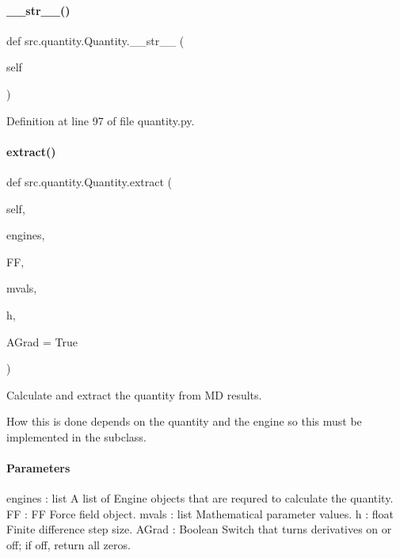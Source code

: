 \paragraph{\texorpdfstring{\+\_\+\+\_\+str\+\_\+\+\_\+()}{\_\_str\_\_()}}
{\footnotesize\ttfamily def src.\+quantity.\+Quantity.\+\_\+\+\_\+str\+\_\+\+\_\+ (\begin{DoxyParamCaption}\item[{}]{self }\end{DoxyParamCaption})}



Definition at line 97 of file quantity.\+py.

\mbox{\label{classsrc_1_1quantity_1_1Quantity_a31f14fa77a8312030e07f3be4b797dec}} 
\paragraph{\texorpdfstring{extract()}{extract()}}
{\footnotesize\ttfamily def src.\+quantity.\+Quantity.\+extract (\begin{DoxyParamCaption}\item[{}]{self,  }\item[{}]{engines,  }\item[{}]{FF,  }\item[{}]{mvals,  }\item[{}]{h,  }\item[{}]{A\+Grad = {\ttfamily True} }\end{DoxyParamCaption})}



Calculate and extract the quantity from MD results. 

How this is done depends on the quantity and the engine so this must be implemented in the subclass.

\paragraph*{Parameters }

engines \+: list A list of Engine objects that are requred to calculate the quantity. FF \+: FF Force field object. mvals \+: list Mathematical parameter values. h \+: float Finite difference step size. A\+Grad \+: Boolean Switch that turns derivatives on or off; if off, return all zeros.


